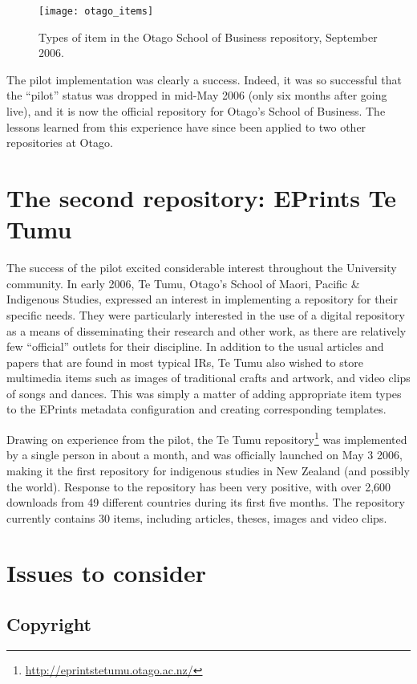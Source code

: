 \documentclass[12pt,pdftex,a4paper,titlepage]{article}
\begin{document}
\begin{figure}
	\centering
	\texttt{[image: otago\_items]}
	\caption{Types of item in the Otago School of Business repository, September 2006.}
	\label{fig-item-types}
\end{figure}


The pilot implementation was clearly a success. Indeed, it was so successful that the ``pilot'' status was dropped in mid-May 2006 (only six months after going live), and it is now the official repository for Otago's School of Business. The lessons learned from this experience have since been applied to two other repositories at Otago.


\section{The second repository: EPrints Te Tumu}

The success of the pilot excited considerable interest throughout the University community. In early 2006, Te Tumu, Otago's School of Maori, Pacific \& Indigenous Studies, expressed an interest in implementing a repository for their specific needs. They were particularly interested in the use of a digital repository as a means of disseminating their research and other work, as there are relatively few ``official'' outlets for their discipline. In addition to the usual articles and papers that are found in most typical IRs, Te Tumu also wished to store multimedia items such as images of traditional crafts and artwork, and video clips of songs and dances. This was simply a matter of adding  appropriate item types to the EPrints metadata configuration and creating corresponding templates.

Drawing on experience from the pilot, the Te Tumu repository\footnote{\url{http://eprintstetumu.otago.ac.nz/}} was implemented by a single person in about a month, and was officially launched on May 3 2006, making it the first repository for indigenous studies in New Zealand (and possibly the world). Response to the repository has been very positive, with over 2,600 downloads from 49 different countries during its first five months. The repository currently contains 30 items, including articles, theses, images and video clips.


\section{Issues to consider}


\subsection{Copyright}
\end{document}
